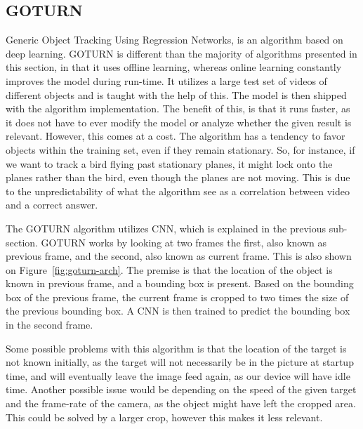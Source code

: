 



\subsection{GOTURN}
Generic Object Tracking Using Regression Networks, is an algorithm based on deep learning\cite{goturn}.
GOTURN is different than the majority of algorithms presented in this section, in that it uses offline learning, whereas online learning constantly improves the model during run-time.
It utilizes a large test set of videos of different objects and is taught with the help of this.
The model is then shipped with the algorithm implementation.
The benefit of this, is that it runs faster, as it does not have to ever modify the model or analyze whether the given result is relevant.
However, this comes at a cost. 
The algorithm has a tendency to favor objects within the training set, even if they remain stationary.
So, for instance, if we want to track a bird flying past stationary planes, it might lock onto the planes rather than the bird, even though the planes are not moving.
This is due to the unpredictability of what the algorithm see as a correlation between video and a correct answer.


The GOTURN algorithm utilizes CNN, which is explained in the previous sub-section.
GOTURN works by looking at two frames the first, also known as previous frame, and the second, also known as current frame.
This is also shown on Figure~\ref{fig:goturn-arch}.
The premise is that the location of the object is known in previous frame, and a bounding box is present.
Based on the bounding box of the previous frame, the current frame is cropped to two times the size of the previous bounding box.
A CNN is then trained to predict the bounding box in the second frame.


Some possible problems with this algorithm is that the location of the target is not known initially, as the target will not necessarily be in the picture at startup time, and will eventually leave the image feed again, as our device will have idle time.
Another possible issue would be depending on the speed of the given target and the frame-rate of the camera, as the object might have left the cropped area. 
This could be solved by a larger crop, however this makes it less relevant.

